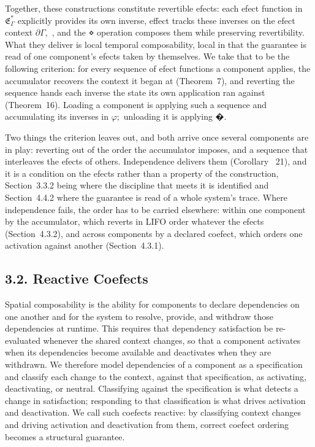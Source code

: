 \documentclass[
  10
]{article}
\begin{document}
Together, these constructions constitute revertible efects: each efect
function in \({ \mathfrak { E } } _ { \Gamma } ^ { * }\) explicitly
provides its own inverse, effect tracks these inverses on the efect
context \(\partial \Gamma ,\) , and the ⋄ operation composes them while
preserving revertibility. What they deliver is local temporal
composability, local in that the guarantee is read of one component's
efects taken by themselves. We take that to be the following criterion:
for every sequence of efect functions a component applies, the
accumulator recovers the context it began at (Theorem~7), and reverting
the sequence hands each inverse the state its own application ran
against (Theorem~16). Loading a component is applying such a sequence
and accumulating its inverses in \(\varphi ;\) unloading it is applying
�.

Two things the criterion leaves out, and both arrive once several
components are in play: reverting out of the order the accumulator
imposes, and a sequence that interleaves the efects of others.
Independence delivers them (Corollary~ 21), and it is a condition on the
efects rather than a property of the construction, Section~3.3.2 being
where the discipline that meets it is identified and Section~4.4.2 where
the guarantee is read of a whole system's trace. Where independence
fails, the order has to be carried elsewhere: within one component by
the accumulator, which reverts in LIFO order whatever the efects
(Section~4.3.2), and across components by a declared coefect, which
orders one activation against another (Section~4.3.1).

\subsection{3.2. Reactive Coefects}\label{reactive-coefects}

Spatial composability is the ability for components to declare
dependencies on one another and for the system to resolve, provide, and
withdraw those dependencies at runtime. This requires that dependency
satisfaction be re-evaluated whenever the shared context changes, so
that a component activates when its dependencies become available and
deactivates when they are withdrawn. We therefore model dependencies of
a component as a specification and classify each change to the context,
against that specification, as activating, deactivating, or neutral.
Classifying against the specification is what detects a change in
satisfaction; responding to that classification is what drives
activation and deactivation. We call such coefects reactive: by
classifying context changes and driving activation and deactivation from
them, correct coefect ordering becomes a structural guarantee.
\end{document}
